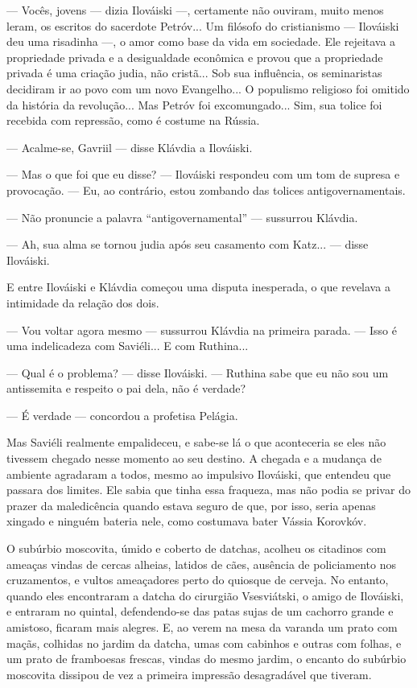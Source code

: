 --- Vocês, jovens --- dizia Ilováiski ---, certamente não ouviram, muito
menos leram, os escritos do sacerdote Petróv... Um filósofo do
cristianismo --- Ilováiski deu uma risadinha ---, o amor como base da
vida em sociedade. Ele rejeitava a propriedade privada e a desigualdade
econômica e provou que a propriedade privada é uma criação judia, não
cristã... Sob sua influência, os seminaristas decidiram ir ao povo com
um novo Evangelho... O populismo religioso foi omitido da história da
revolução... Mas Petróv foi excomungado... Sim, sua tolice foi recebida
com repressão, como é costume na Rússia.

--- Acalme-se, Gavriil --- disse Klávdia a Ilováiski.

--- Mas o que foi que eu disse? --- Ilováiski respondeu com um tom de
supresa e provocação. --- Eu, ao contrário, estou zombando das tolices
antigovernamentais.

--- Não pronuncie a palavra ``antigovernamental'' --- sussurrou Klávdia.

--- Ah, sua alma se tornou judia após seu casamento com Katz... ---
disse Ilováiski.

E entre Ilováiski e Klávdia começou uma disputa inesperada, o que
revelava a intimidade da relação dos dois.

--- Vou voltar agora mesmo --- sussurrou Klávdia na primeira parada. ---
Isso é uma indelicadeza com Saviéli... E com Ruthina...

--- Qual é o problema? --- disse Ilováiski. --- Ruthina sabe que eu não
sou um antissemita e respeito o pai dela, não é verdade?

--- É verdade --- concordou a profetisa Pelágia.

Mas Saviéli realmente empalideceu, e sabe-se lá o que aconteceria se
eles não tivessem chegado nesse momento ao seu destino. A chegada e a
mudança de ambiente agradaram a todos, mesmo ao impulsivo Ilováiski, que
entendeu que passara dos limites. Ele sabia que tinha essa fraqueza, mas
não podia se privar do prazer da maledicência quando estava seguro de
que, por isso, seria apenas xingado e ninguém bateria nele, como
costumava bater Vássia Korovkóv.

O subúrbio moscovita, úmido e coberto de datchas, acolheu os citadinos
com ameaças vindas de cercas alheias, latidos de cães, ausência de
policiamento nos cruzamentos, e vultos ameaçadores perto do quiosque de
cerveja. No entanto, quando eles encontraram a datcha do cirurgião
Vsesviátski, o amigo de Ilováiski, e entraram no quintal, defendendo-se
das patas sujas de um cachorro grande e amistoso, ficaram mais alegres.
E, ao verem na mesa da varanda um prato com maçãs, colhidas no jardim da
datcha, umas com cabinhos e outras com folhas, e um prato de framboesas
frescas, vindas do mesmo jardim, o encanto do subúrbio moscovita
dissipou de vez a primeira impressão desagradável que tiveram.

